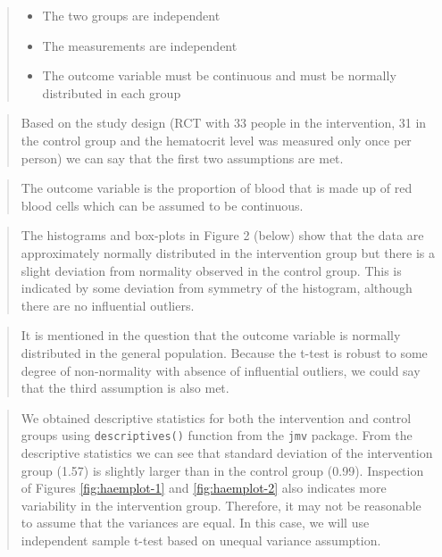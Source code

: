 \documentclass[
]{memoir}
\providecommand{\tightlist}{%
  \setlength{\itemsep}{0pt}\setlength{\parskip}{0pt}}
\begin{document}
\begin{quote}
\begin{itemize}
\tightlist
\item
  The two groups are independent
\item
  The measurements are independent
\item
  The outcome variable must be continuous and must be normally distributed in each group
\end{itemize}
\end{quote}

\begin{quote}
Based on the study design (RCT with 33 people in the intervention, 31 in the control group and the hematocrit level was measured only once per person) we can say that the first two assumptions are met.
\end{quote}

\begin{quote}
The outcome variable is the proportion of blood that is made up of red blood cells which can be assumed to be continuous.
\end{quote}

\begin{quote}
The histograms and box-plots in Figure 2 (below) show that the data are approximately normally distributed in the intervention group but there is a slight deviation from normality observed in the control group. This is indicated by some deviation from symmetry of the histogram, although there are no influential outliers.
\end{quote}

\begin{quote}
It is mentioned in the question that the outcome variable is normally distributed in the general population. Because the t-test is robust to some degree of non-normality with absence of influential outliers, we could say that the third assumption is also met.
\end{quote}

\begin{quote}
We obtained descriptive statistics for both the intervention and control groups using \texttt{descriptives()} function from the \texttt{jmv} package. From the descriptive statistics we can see that standard deviation of the intervention group (1.57) is slightly larger than in the control group (0.99). Inspection of Figures \ref{fig:haemplot-1} and \ref{fig:haemplot-2} also indicates more variability in the intervention group. Therefore, it may not be reasonable to assume that the variances are equal. In this case, we will use independent sample t-test based on unequal variance assumption.
\end{quote}
\end{document}
